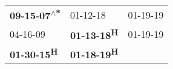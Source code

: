 \begin{supertabular}{lll}
 \textbf{09-15-07\textsuperscript{$\wedge$*}} &            01-12-18\textsuperscript{} &  01-19-19\textsuperscript{} \\
                   04-16-09\textsuperscript{} &  \textbf{01-13-18\textsuperscript{H}} &  01-19-19\textsuperscript{} \\
         \textbf{01-30-15\textsuperscript{H}} &  \textbf{01-18-19\textsuperscript{H}} &                             \\
\end{supertabular}
